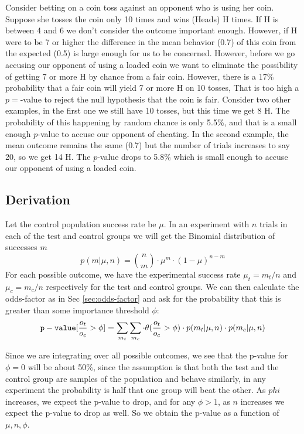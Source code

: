 \documentclass[12pt]{report}
\newcommand{\bdm}{\begin{displaymath}} %
\newcommand{\edm}{\end{displaymath}} %
\begin{document}
Consider betting on a coin toss against an opponent who is using her
coin. Suppose she tosses the coin only 10 times and wins (Heads) H times.
If H is between 4 and 6 we don't consider the outcome important enough.
However, if H were to be 7 or higher the difference in the mean behavior
(0.7) of this coin from the expected (0.5) is large enough for us to be
concerned. However, before we go accusing our opponent of using a loaded
coin we want to eliminate the possibility of getting 7 or more H by chance
from a fair coin. However, there is a 17\% probability that a fair coin
will yield 7 or more H on 10 tosses, That is too high a \(p=\)-value to
reject the null hypothesis that the coin is fair.
Consider two other examples, in the first one we still have 10 tosses,
but this time we get 8 H. The probability of this happening by random chance
is only 5.5\%, and that is a small enough \(p\)-value to accuse our opponent
of cheating. In the second example, the mean outcome remains the same (0.7)
but the number of trials increases to say 20, so we get 14 H.
The \(p\)-value drops to 5.8\% which is small enough to accuse our opponent
of using a loaded coin. 

\subsection{Derivation}
Let the control population success rate be \(\mu\). In an experiment with
\(n\) trials in each of the test and control groups we will get
the Binomial 
distribution of successes \(m\)
\bdm
  p(m|\mu,n)= {n \choose m}\cdot \mu^m \cdot (1-\mu)^{n-m}
\edm
For each possible outcome, we have the experimental success rate \(\mu_t=m_t/n\)
and \(\mu_c=m_c/n\) respectively for the test and control groups. We can then
calculate the odds-factor as in Sec \ref{sec:odds-factor} and ask for the
probability that this is greater than some importance threshold \(\phi\):
\bdm
    {\tt p-value}[\frac{o_t}{o_c} > \phi] = \sum_{m_t}\sum_{m_c}\cdot
    \theta(\frac{o_t}{o_c} > \phi)\cdot p(m_t|\mu,n)\cdot p(m_c|\mu,n)
\edm

Since we are integrating over all possible outcomes, we see that the p-value
for \(\phi=0\) will be about 50\%, since the assumption is that both the
test and the control group are samples of the population and behave similarly,
in any experiment the probability is half that one group will beat the other.
As \(phi\) increases, we expect the p-value to drop, and for any \(\phi>1\),
as \(n\) increases we expect the p-value to drop as well. So we obtain the p-value as a function of \(\mu, n, \phi\).
\end{document}
